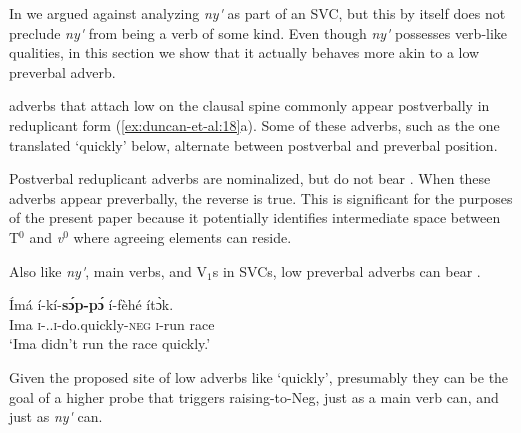 \documentclass[output=paper]{../langsci/langscibook}
\begin{document}
In  we argued against analyzing \textit{ny\'{\textturnv}\ng} as part of an SVC, but this by itself does not preclude \textit{ny\'{\textturnv}\ng} from being a verb of some kind. Even though \textit{ny\'{\textturnv}\ng} possesses verb-like qualities, in this section we show that it actually behaves more akin to a low preverbal adverb.

 adverbs that attach low on the clausal spine commonly appear postverbally in reduplicant form (\ref{ex:duncan-et-al:18}a). Some of these adverbs, such as the one translated `quickly' below, alternate between postverbal and preverbal position.

\ea\label{ex:duncan-et-al:18}
\z
\z

\noindent Postverbal reduplicant adverbs are nominalized, but do not bear . When these adverbs appear preverbally, the reverse is true. This is significant for the purposes of the present paper because it potentially identifies intermediate space between T$^0$ and \textit{v}$^0$ where  agreeing elements can reside.

Also like \textit{ny\'{\textturnv}\ng}, main verbs, and V$_1$s in SVCs, low preverbal adverbs can bear .

\ea\label{ex:duncan-et-al:19}
\gll \'{I}m\'{a} \'{i}-k\'{i}-\textbf{s\'ɔp-p\'ɔ} \'{i}-f\`{e}h\'{e} \'{i}t\`ɔk. \\
Ima \textsc{i}-{\pst.\foc}.\textsc{i}-do.quickly-\textsc{neg} \textsc{i}-run race \\
\glt `Ima didn't run the race quickly.'
\z

\noindent Given the proposed site of low adverbs like `quickly', presumably they can be the goal of a higher probe that triggers raising-to-Neg, just as a main verb can, and just as \textit{ny\'{\textturnv}\ng} can. 
\end{document}
